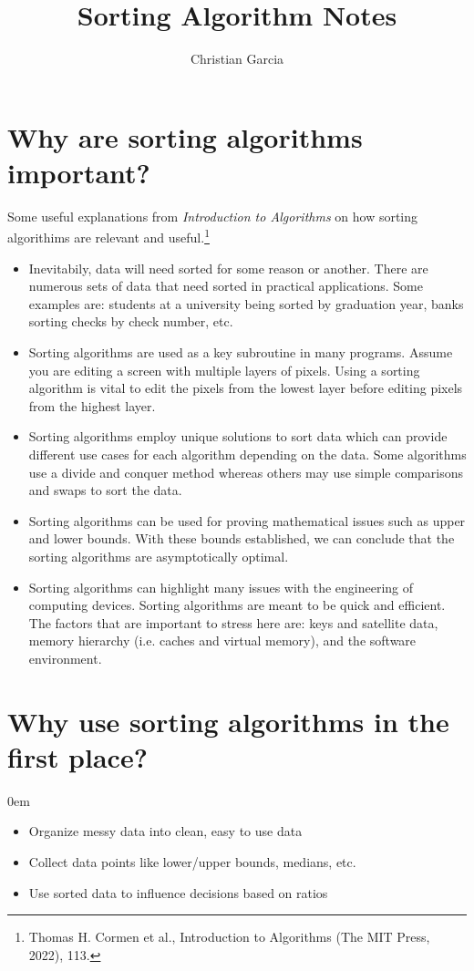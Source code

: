 \documentclass[11pt]{article}
\title{\textbf{Sorting Algorithm Notes}}
\author{Christian Garcia}
\date{}
\begin{document}
\maketitle
\thispagestyle{empty}

\section{Why are sorting algorithms important?}
Some useful explanations from \emph{Introduction to Algorithms} on how sorting algorithims are relevant and useful.\footnote{Thomas H. Cormen et al., Introduction to Algorithms (The MIT Press, 2022), 113.}

\begin{itemize}
\item{Inevitabily, data will need sorted for some reason or another. There are numerous sets of data that need sorted in practical applications. Some examples are: students at a university being sorted by graduation year, banks sorting checks by check number, etc.}
\item{Sorting algorithms are used as a key subroutine in many programs. Assume you are editing a screen with multiple layers of pixels. Using a sorting algorithm is vital to edit the pixels from the lowest layer before editing pixels from the highest layer.}
\item{Sorting algorithms employ unique solutions to sort data which can provide different use cases for each algorithm depending on the data. Some algorithms use a divide and conquer method whereas others may use simple comparisons and swaps to sort the data.}
\item{Sorting algorithms can be used for proving mathematical issues such as upper and lower bounds. With these bounds established, we can conclude that the sorting algorithms are asymptotically optimal.}
\item{Sorting algorithms can highlight many issues with the engineering of computing devices. Sorting algorithms are meant to be quick and efficient. The factors that are important to stress here are: keys and satellite data, memory hierarchy (i.e. caches and virtual memory), and the software environment.}
\end{itemize}


\section{Why use sorting algorithms in the first place?}
\addtolength{\itemindent}{0.80cm}
\itemsep0em 
\begin{itemize}
\item{Organize messy data into clean, easy to use data}
\item{Collect data points like lower/upper bounds, medians, etc.}
\item{Use sorted data to influence decisions based on ratios}
\end{itemize}
\end{document}
